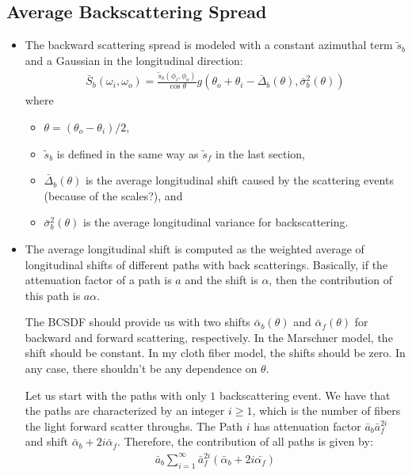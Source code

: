 \documentclass[10pt]{article}
\begin{document}
  \subsection{Average Backscattering Spread}
  \begin{itemize}
    \item The backward scattering spread is modeled with a constant azimuthal term $\tilde{s}_b$ and a Gaussian in the longitudinal direction:
    \begin{align*}
      \bar{S}_b(\omega_i, \omega_o) = \frac{\tilde{s}_b(\phi_i, \phi_o)}{\cos \theta} g(\theta_o + \theta_i - \bar{\Delta}_b(\theta), \bar{\sigma}_b^2(\theta))
    \end{align*}
    where
    \begin{itemize}
      \item $\theta = (\theta_o - \theta_i)/2$,
      \item $\tilde{s}_b$ is defined in the same way as $\tilde{s}_f$ in the last section,
      \item $\bar{\Delta}_b(\theta)$ is the average longitudinal shift caused by the scattering events (because of the scales?), and
      \item $\bar{\sigma}_b^2(\theta)$ is the average longitudinal variance for backscattering.
    \end{itemize}
    
    \item The average longitudinal shift is computed as the weighted average of longitudinal shifts of different paths with back scatterings.  Basically, if the attenuation factor of a path is $a$ and the shift is $\alpha$, then the contribution of this path is $a\alpha$.  

    The BCSDF should provide us with two shifts $\bar{\alpha}_b(\theta)$ and $\bar{\alpha}_f(\theta)$ for backward and forward scattering, respectively.  In the Marschner model, the shift should be constant.  In my cloth fiber model, the shifts should be zero.  In any case, there shouldn't be any dependence on $\theta$.

    Let us start with the paths with only $1$ backscattering event.  We have that the paths are characterized by an integer $i \geq 1$, which is the number of fibers the light forward scatter throughs.  The Path $i$ has attenuation factor $\bar{a}_b \bar{a}_f^{2i}$ and shift $\bar{\alpha}_b + 2i\bar{\alpha}_f$.  Therefore, the contribution of all paths is given by:
    \begin{align*}
      \bar{a}_b \sum_{i=1}^\infty \bar{a}_f^{2i}( \bar{\alpha}_b + 2i\bar{\alpha_f})
    \end{align*}


\end{itemize}
\end{document}
